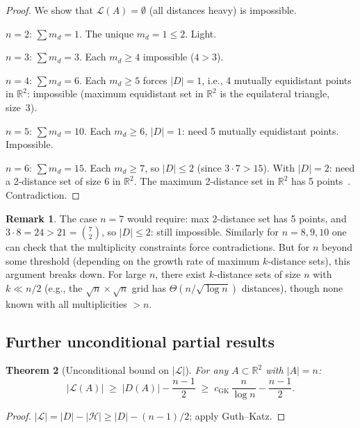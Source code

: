 \documentclass[12pt,a4paper]{amsart}
\theoremstyle{plain}
\newtheorem{theorem}{Theorem}[section]
\theoremstyle{definition}
\newtheorem{remark}[theorem]{Remark}
\newcommand{\R}{\mathbb{R}}
\newcommand{\abs}[1]{\left\lvert #1 \right\rvert}
\newcommand{\cL}{\mathcal{L}}
\newcommand{\cH}{\mathcal{H}}
\begin{document}
\begin{proof}
We show that $\cL(A) = \emptyset$ (all distances heavy) is impossible.

\noindent$n=2$: $\sum m_d=1$. The unique $m_d=1\le 2$. Light. \checkmark

\noindent$n=3$: $\sum m_d=3$. Each $m_d\ge 4$ impossible ($4>3$). \checkmark

\noindent$n=4$: $\sum m_d=6$. Each $m_d\ge 5$ forces $\abs{D}=1$,
i.e., 4 mutually equidistant points in $\R^2$: impossible (maximum
equidistant set in $\R^2$ is the equilateral triangle, size~3). \checkmark

\noindent$n=5$: $\sum m_d=10$. Each $m_d\ge 6$, $\abs{D}=1$: need 5
mutually equidistant points. Impossible. \checkmark

\noindent$n=6$: $\sum m_d=15$. Each $m_d\ge 7$, so $\abs{D}\le 2$ (since
$3\cdot 7>15$). With $\abs{D}=2$: need a 2-distance set of size 6 in $\R^2$.
The maximum 2-distance set in $\R^2$ has 5 points~\cite{Einhorn1966}.
Contradiction. \checkmark
\end{proof}

\begin{remark}
The case $n=7$ would require: max 2-distance set has 5 points, and
$3\cdot 8=24>21=\binom{7}{2}$, so $\abs{D}\le 2$: still impossible.
Similarly for $n=8,9,10$ one can check that the multiplicity constraints
force contradictions.  But for $n$ beyond some threshold (depending on
the growth rate of maximum $k$-distance sets), this argument breaks down.
For large $n$, there exist $k$-distance sets of size $n$ with $k \ll n/2$
(e.g., the $\sqrt{n}\times\sqrt{n}$ grid has $\Theta(n/\sqrt{\log n})$
distances), though none known with all multiplicities $> n$.
\end{remark}

\subsection{Further unconditional partial results}

\begin{theorem}[Unconditional bound on $\abs{\cL}$]
\label{thm:unconditional}
For any $A \subset \R^2$ with $\abs{A} = n$:
\[
  \abs{\cL(A)} \;\ge\; \abs{D(A)} - \frac{n-1}{2}
  \;\ge\; c_{\mathrm{GK}}\,\frac{n}{\log n} - \frac{n-1}{2}.
\]
\end{theorem}

\begin{proof}
$\abs{\cL} = \abs{D} - \abs{\cH} \ge \abs{D} - (n-1)/2$;
apply Guth--Katz.
\end{proof}
\end{document}
